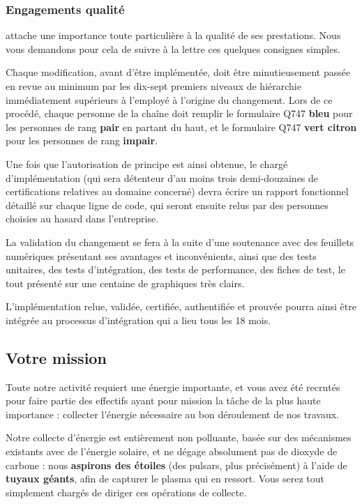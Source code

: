\subsubsection{Engagements qualité}

\provogon{} attache une importance toute particulière à la qualité de ses
prestations. Nous vous demandons pour cela de suivre à la lettre ces quelques
consignes simples.

Chaque modification, avant d'être implémentée, doit être minutieusement passée
en revue au minimum par les dix-sept premiers niveaux de hiérarchie
immédiatement supérieurs à l'employé à l'origine du changement.  Lors de ce
procédé, chaque personne de la chaîne doit remplir le formulaire Q747
\textbf{bleu} pour les personnes de rang \textbf{pair} en partant du haut, et
le formulaire Q747 \textbf{vert citron} pour les personnes de rang
\textbf{impair}.

Une fois que l'autorisation de principe est ainsi obtenue, le chargé
d'implémentation (qui sera détenteur d'au moins trois demi-douzaines de
certifications relatives au domaine concerné) devra écrire un rapport
fonctionnel détaillé sur chaque ligne de code, qui seront ensuite relus par des
personnes choisies au hasard dans l'entreprise.

La validation du changement se fera à la suite d'une soutenance avec des
feuillets numériques présentant ses avantages et inconvénients, ainsi que des
tests unitaires, des tests d'intégration, des tests de performance, des fiches
de test, le tout présenté sur une centaine de graphiques très clairs.

L'implémentation relue, validée, certifiée, authentifiée et prouvée pourra
ainsi être intégrée au processus d'intégration qui a lieu tous les 18 mois.

\subsection{Votre mission}
\label{sec:mission}

Toute notre activité requiert une énergie importante, et vous avez été recrutés
pour faire partie des effectifs ayant pour mission la tâche de la plus haute
importance : collecter l'énergie nécessaire au bon déroulement de nos travaux.

Notre collecte d'énergie est entièrement non polluante, basée sur des
mécanismes existants avec de l'énergie solaire, et ne dégage absolument pas de
dioxyde de carbone : nous \textbf{aspirons des étoiles} (des pulsars, plus
précisément) à l'aide de \textbf{tuyaux géants}, afin de capturer le plasma qui
en ressort. Vous serez tout simplement chargés de diriger ces opérations de
collecte.

